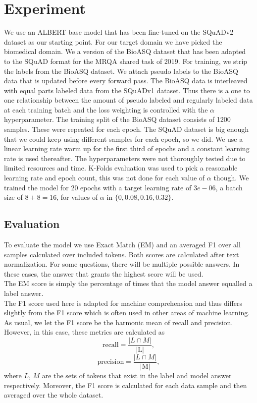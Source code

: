 \documentclass[twoside,twocolumn]{article}
\begin{document}

\section{Experiment}
We use an ALBERT base model that has been fine-tuned on the SQuADv2 dataset as
our starting point. For our target domain we have picked the biomedical domain.
We a version of the BioASQ dataset that has been adapted to
the SQuAD format for the MRQA shared task of 2019. For training, we strip the
labels from the BioASQ dataset. We attach pseudo labels to the BioASQ data that
is updated before every forward pass. The BioASQ
data is interleaved with equal parts labeled data from the SQuADv1 dataset.
Thus there is a one to one relationship between the amount of pseudo labeled and
regularly labeled data at each training batch and the loss weighting is
controlled with the $\alpha$ hyperparameter. The training split of the BioASQ
dataset consists of 1200 samples. These were repeated for each epoch. The SQuAD
dataset is big enough that we could keep using different samples for each epoch,
so we did.
We use a linear learning rate warm up for the first third of epochs and a
constant learning rate is used thereafter. 
The hyperparameters were not thoroughly tested due to limited resources and
time. K-Folds evaluation was used to pick a reasonable learning rate and epoch
count, this was not done for each value of $\alpha$ though. We trained the model
for $20$ epochs with a target learning rate of $3e-06$, a batch size of $8
+ 8 = 16$, for values of $\alpha$ in $\{0, 0.08, 0.16, 0.32\}$.


\subsection{Evaluation}
To evaluate the model we use Exact Match (EM) and an averaged F1 over all samples
calculated over included tokens. Both scores are calculated after text
normalization. For some questions, there will be multiple possible answers. In
these cases, the answer that grants the highest score will be used. \\

The EM score is simply the percentage of times that the model answer equalled
a label answer.  \\

The F1 score used here is adapted for machine comprehension and thus differs
slightly from the F1 score which is often used in other areas of machine
learning. As usual, we let the F1 score be the harmonic mean of recall and
precision. However, in this case, these metrics are calculated as 
\[
	\text{recall} = \frac{|L \cap M|}{\text{|L|}},
\]
\[
	\text{precision} = \frac{|L \cap M|}{\text{|M|}},
\]
where $L$, $M$ are the sets of tokens that exist in the label and model answer
respectively. Moreover, the F1 score is calculated for each data sample and
then averaged over the whole dataset.
\end{document}
